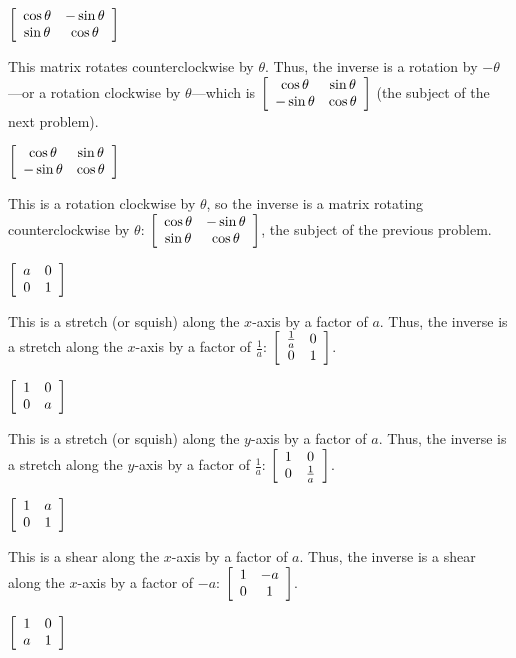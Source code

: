 \documentclass[../key.tex]{subfiles}
\begin{document}
\begin{inner_problem}
\item $\left[\begin{array}{cc} \cos\theta & -\sin\theta \\ \sin\theta & \cos\theta \end{array}\right]$
\end{inner_problem}

This matrix rotates counterclockwise by $\theta$. Thus, the inverse is a rotation by $-\theta$---or a rotation clockwise by $\theta$---which is $\left[\begin{array}{cc} \cos\theta & \sin\theta \\ -\sin\theta & \cos\theta \end{array}\right]$ (the subject of the next problem).

\begin{inner_problem}
\item $\left[\begin{array}{cc} \cos\theta & \sin\theta \\ -\sin\theta & \cos\theta \end{array}\right]$
\end{inner_problem}

This is a rotation clockwise by $\theta$, so the inverse is a matrix rotating counterclockwise by $\theta$: $\left[\begin{array}{cc} \cos\theta & -\sin\theta \\ \sin\theta & \cos\theta \end{array}\right]$, the subject of the previous problem.

\begin{inner_problem}
\item $\left[\begin{array}{cc} a & 0 \\ 0 & 1 \end{array}\right]$
\end{inner_problem}

This is a stretch (or squish) along the $x$-axis by a factor of $a$. Thus, the inverse is a stretch along the $x$-axis by a factor of $\frac{1}{a}$: $\left[\begin{array}{cc} \frac{1}{a} & 0 \\ 0 & 1 \end{array}\right]$.

\begin{inner_problem}
\item $\left[\begin{array}{cc} 1 & 0 \\ 0 & a \end{array}\right]$
\end{inner_problem}

This is a stretch (or squish) along the $y$-axis by a factor of $a$. Thus, the inverse is a stretch along the $y$-axis by a factor of $\frac{1}{a}$: $\left[\begin{array}{cc} 1 & 0 \\ 0 & \frac{1}{a} \end{array}\right]$.

\begin{inner_problem}
\item $\left[\begin{array}{cc} 1 & a \\ 0 & 1 \end{array}\right]$
\end{inner_problem}

This is a shear along the $x$-axis by a factor of $a$. Thus, the inverse is a shear along the $x$-axis by a factor of $-a$: $\left[\begin{array}{cc} 1 & -a \\ 0 & 1 \end{array}\right]$.

\begin{inner_problem}
\item $\left[\begin{array}{cc} 1 & 0 \\ a & 1 \end{array}\right]$
\end{inner_problem}
\end{document}
